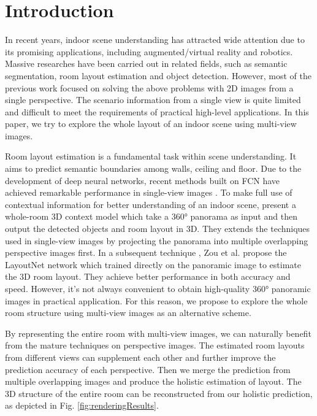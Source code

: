 \section{Introduction}

In recent years, indoor scene understanding has attracted wide attention due to its promising applications, including augmented/virtual reality and robotics. Massive researches have been carried out in related fields, such as semantic segmentation, room layout estimation and object detection. However, most of the previous work focused on solving the above problems with 2D images from a single perspective. The scenario information from a single view is quite limited and difficult to meet the requirements of practical high-level applications. In this paper, we try to explore the whole layout of an indoor scene using multi-view images.

Room layout estimation is a fundamental task within scene understanding. It aims to predict semantic boundaries among walls, ceiling and floor. Due to the development of deep neural networks, recent methods built on FCN have achieved remarkable performance in single-view images \cite{PIO,CFILE,DELAY,ICIP2018}. To make full use of contextual information for better understanding of an indoor scene, \cite{panocontext} present a whole-room 3D context model which take a \ang{360} panorama as input and then output the detected objects and room layout in 3D. They extends the techniques used in single-view images by projecting the panorama into multiple overlapping perspective images first. In a subsequent technique \cite{LayoutNet}, Zou et al. propose the LayoutNet network which trained directly on the panoramic image to estimate the 3D room layout. They achieve better performance in both accuracy and speed. However, it's not always convenient to obtain high-quality \ang{360} panoramic images in practical application. For this reason, we propose to explore the whole room structure using multi-view images as an alternative scheme.


By representing the entire room with multi-view images, we can naturally benefit from the mature techniques on perspective images. The estimated room layouts from different views can supplement each other and further improve the prediction accuracy of each perspective. Then we merge the prediction from multiple overlapping images and produce the holistic estimation of layout. The 3D structure of the entire room can be reconstructed from our holistic prediction, as depicted in Fig. \ref{fig:renderingResults}.

